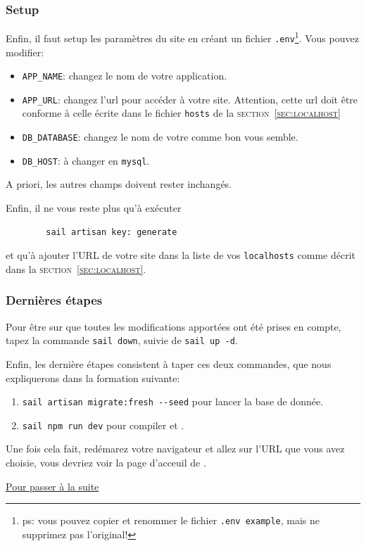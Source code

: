     \subsubsection[Setup]{Setup}
    Enfin, il faut setup les paramètres du site en créant un fichier \verb|.env|\footnote{ps: vous pouvez copier et renommer le fichier \verb|.env example|, mais ne supprimez pas l'original!}. Vous pouvez modifier:

    \begin{itemize}
        \item \verb|APP_NAME|: changez le nom de votre application.
        \item \verb|APP_URL|: changez l'url pour accéder à votre site. Attention, cette url doit être conforme à celle écrite dans le fichier \verb|hosts| de la \textsc{section~\ref{sec:localhost}}
        \item \verb|DB_DATABASE|: changez le nom de votre \db{} comme bon vous semble.
        \item \verb|DB_HOST|: à changer en \verb|mysql|.
    \end{itemize}
    A priori, les autres champs doivent rester inchangés.

    Enfin, il ne vous reste plus qu'à exécuter 
    \begin{lstlisting}
        sail artisan key: generate
    \end{lstlisting}

    et qu'à ajouter l'URL de votre site dans la liste de vos \texttt{localhosts} comme décrit dans la \textsc{section~\ref{sec:localhost}}.

    \subsubsection[Dernières étapes]{Dernières étapes}
    Pour être sur que toutes les modifications apportées ont été prises en compte, tapez la commande \verb|sail down|, suivie de \verb|sail up -d|.
    
    Enfin, les dernière étapes consistent à taper ces deux commandes, que nous expliquerons dans la formation suivante:
    \begin{enumerate}
        \item \verb|sail artisan migrate:fresh --seed| pour lancer la base de donnée.
        \item \verb|sail npm run dev| pour compiler \css{} et \js{}.
    \end{enumerate}

    Une fois cela fait, redémarez votre navigateur et allez sur l'URL que vous avez choisie, vous devriez voir la page d'acceuil de \laravel{}.

    \hyperref[sec:suite]{Pour passer à la suite}
